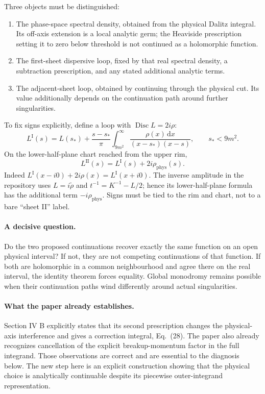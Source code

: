 \documentclass[11pt,a4paper]{article}
\newcommand{\dd}{\,\mathrm d}
\newcommand{\Disc}{\operatorname{Disc}}
\newcommand{\phys}{\mathrm{phys}}
\begin{document}
Three objects must be distinguished:
\begin{enumerate}
\item The phase-space spectral density, obtained from the physical Dalitz integral. Its off-axis extension is a local analytic germ; the Heaviside prescription setting it to zero below threshold is not continued as a holomorphic function.
\item The first-sheet dispersive loop, fixed by that real spectral density, a subtraction prescription, and any stated additional analytic terms.
\item The adjacent-sheet loop, obtained by continuing through the physical cut. Its value additionally depends on the continuation path around further singularities.
\end{enumerate}
To fix signs explicitly, define a loop with $\Disc L=2i\rho$:
\begin{equation}
 L^{\mathrm I}(s)=L(s_*)+\frac{s-s_*}{\pi}
 \int_{9m^2}^{\infty}\frac{\rho(x)\dd x}{(x-s_*)(x-s)},\qquad s_*<9m^2.
 \label{eq:disp}
\end{equation}
On the lower-half-plane chart reached from the upper rim,
\begin{equation}
 L^{\mathrm {II}}(s)=L^{\mathrm I}(s)+2i\rho_{\phys}(s).
 \label{eq:second}
\end{equation}
Indeed $L^{\mathrm I}(x-i0)+2i\rho(x)=L^{\mathrm I}(x+i0)$. The inverse amplitude in the repository uses $L=i\widetilde\rho$ and $t^{-1}=K^{-1}-L/2$; hence its lower-half-plane formula has the additional term $-i\rho_{\phys}$. Signs must be tied to the rim and chart, not to a bare ``sheet II'' label.

\paragraph{A decisive question.} Do the two proposed continuations recover exactly the same function on an open physical interval? If not, they are not competing continuations of that function. If both are holomorphic in a common neighbourhood and agree there on the real interval, the identity theorem forces equality. Global monodromy remains possible when their continuation paths wind differently around actual singularities.

\paragraph{What the paper already establishes.} Section IV B explicitly states that its second prescription changes the physical-axis interference and gives a correction integral, Eq.~(28). The paper also already recognizes cancellation of the explicit breakup-momentum factor in the full integrand. Those observations are correct and are essential to the diagnosis below. The new step here is an explicit construction showing that the physical choice is analytically continuable despite its piecewise outer-integrand representation.
\end{document}
